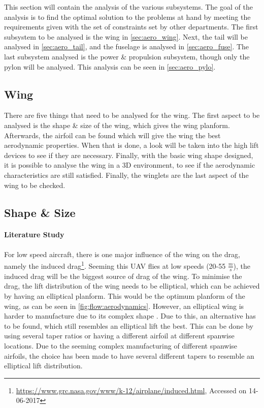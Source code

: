This section will contain the analysis of the various subsystems. The goal of the analysis is to find the optimal solution to the problems at hand by meeting the requirements given with the set of constraints set by other departments. The first subsystem to be analysed is the wing in \autoref{sec:aero_wing}. Next, the tail will be analysed in \autoref{sec:aero_tail}, and the fuselage is analysed in \autoref{sec:aero_fuse}. The last subsystem analysed is the power \& propulsion subsystem, though only the pylon will be analysed. This analysis can be seen in \autoref{sec:aero_pylo}.

\subsection{Wing}
\label{sec:aero_wing}

There are five things that need to be analysed for the wing. The first aspect to be analysed is the shape \& size of the wing, which gives the wing planform. Afterwards, the airfoil can be found which will give the wing the best aerodynamic properties. When that is done, a look will be taken into the high lift devices to see if they are necessary. Finally, with the basic wing shape designed, it is possible to analyse the wing in a 3D environment, to see if the aerodynamic characteristics are still satisfied. Finally, the winglets are the last aspect of the wing to be checked.

\subsection*{Shape \& Size}

\paragraph{Literature Study} For low speed aircraft, there is one major influence of the wing on the drag, namely the induced drag\footnote{\url{https://www.grc.nasa.gov/www/k-12/airplane/induced.html}, Accessed on 14-06-2017}. Seeming this UAV flies at low speeds (20-55 $\frac{m}{s}$), the induced drag will be the biggest source of drag of the wing. To minimise the drag, the lift distribution of the wing needs to be elliptical, which can be achieved by having an elliptical planform. This would be the optimum planform of the wing, as can be seen in \autoref{fig:flow:aerodynamics}. However, an elliptical wing is harder to manufacture due to its complex shape \cite{ellipticalmanu}. Due to this, an alternative has to be found, which still resembles an elliptical lift the best. This can be done by using several taper ratios or having a different airfoil at different spanwise locations. Due to the seeming complex manufacturing of different spanwise airfoils, the choice has been made to have several different tapers to resemble an elliptical lift distribution.

